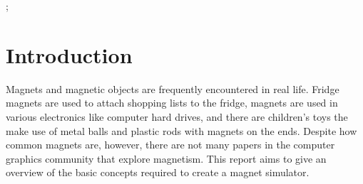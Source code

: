 \documentclass[tog]{acmsiggraph}
\begin{document}

\begin{CRcatlist}
  ;
\end{CRcatlist}


\keywordlist




\copyrightspace


\section{Introduction}

Magnets and magnetic objects are frequently encountered in real life. Fridge magnets are used to attach shopping lists to the fridge, magnets are used in various electronics like computer hard drives, and there are children's toys the make use of metal balls and plastic rods with magnets on the ends. Despite how common magnets are, however, there are not many papers in the computer graphics community that explore magnetism. This report aims to give an overview of the basic concepts required to create a magnet simulator.
\end{document}
